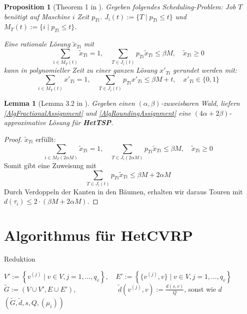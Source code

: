 \documentclass[a4paper,ngerman,12pt,bibtotoc]{scrartcl}
\theoremstyle{definition}
\theoremstyle{plain}
\newtheorem{prop}[defn]{Proposition}
\newtheorem{lemma}[defn]{Lemma}
\theoremstyle{remark}
\newcommand{\HetTSP}{\textbf{HetTSP}}
\newcommand{\HetCVRP}{\textbf{HetCVRP}}
\begin{document}
	\begin{prop}[Theorem 1 in \cite{Rounding}]
		Gegeben folgendes Scheduling-Problem: Job $T$ benötigt auf Maschine $i$ Zeit $p_{Ti}$. $J_i(t) := \{T \mid p_{Ti} \leq t\}$ und $M_T(t) := \{i \mid p_{Ti} \leq t\}$.
		
		Eine rationale Lösung $\tilde{x}_{Ti}$ mit
			\[\sum_{i\in M_T(t)} \tilde{x}_{Ti} = 1, \quad \sum_{T\in J_i(t)} p_{Ti}\tilde{x}_{Ti} \leq \beta M, \quad \tilde{x}_{Ti} \geq 0 \]		
		kann in polynomieller Zeit zu einer ganzen Lösung $x'_{Ti}$ gerundet werden mit:
			\[\sum_{i\in M_T(t)} x'_{Ti} = 1, \quad \sum_{T\in J_i(t)} p_{Ti} x'_{Ti} \leq \beta M + t, \quad x'_{Ti} \in \{0,1\} \]
	\end{prop}
	
	\begin{lemma}[Lemma 3.2 in \cite{HetCVRP}]
		Gegeben einen $(\alpha, \beta)$-zuweisbaren Wald, liefern \cref{AlgFractionalAssignment} und \cref{AlgRoundingAssignment} eine $(4\alpha+2\beta)$-approximative Lösung für \HetTSP.
	\end{lemma}
	
	\begin{proof}
		$\tilde{x}_{Ti}$ erfüllt:
			\[\sum_{i\in M_T(2\alpha M)} \tilde{x}_{Ti} = 1, \quad \sum_{T\in J_i(2\alpha M)} p_{Ti}\tilde{x}_{Ti} \leq \beta M, \quad \tilde{x}_{Ti} \geq 0 \]
		Somit gibt  eine Zuweisung mit 	
			\[\sum_{T\in J_i(t)} p_{Ti}\tilde{x}_{Ti} \leq \beta M + 2\alpha M\]
		Durch Verdoppeln der Kanten in den Bäumen, erhalten wir daraus Touren mit $d(\tau_i) \leq 2\cdot \left(\beta M + 2\alpha M\right)$.
	\end{proof}
	
	\section{Algorithmus für \HetCVRP}
	
	\begin{algorithm}[H]
		\caption{Reduktion}\label{AlgReduktion}
		\begin{algorithmic}[1]
			\State $V' := \left\lbrace v^{(j)} \mid v \in V, j=1,\dots,q_v\right\rbrace,\quad E' := \left\lbrace \{v^{(j)},v\} \mid v \in V, j=1,\dots,q_v\right\rbrace$
			\State $\tilde{G} := (V\cup V', E\cup E'), \quad\quad\quad\quad\quad\quad \tilde{d}(v^{(j)},v) := \frac{d(s,v)}{Q}$, sonst wie $d$
			\State \Return $\left(\tilde{G}, \tilde{d}, s, Q, (\mu_i)\right)$
			\EndProcedure
		\end{algorithmic}
	\end{algorithm}	
	
\end{document}
